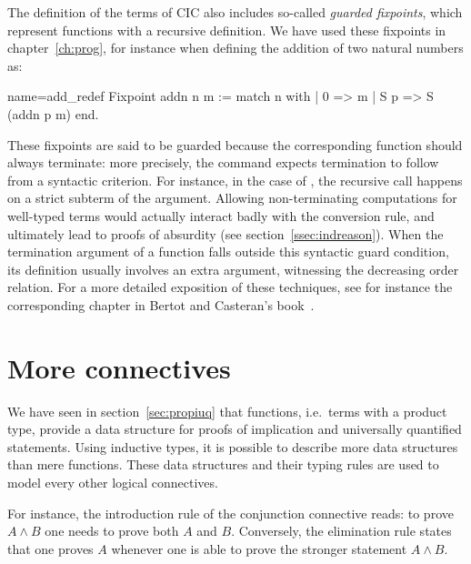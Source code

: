 The definition of the terms of CIC also includes so-called
\emph{guarded fixpoints}, which represent functions with a recursive
definition. We have used these fixpoints in chapter~\ref{ch:prog}, for
instance when defining the addition of two natural numbers as:

\begin{coq}{name=add_redef}{}
Fixpoint addn n m :=
  match n with
  | 0 => m
  | S p => S (addn p m)
  end.
\end{coq}
These fixpoints are said to be guarded because the corresponding
function should always terminate: more precisely, the 
command expects termination to follow from a syntactic
criterion. For instance, in the case of , the recursive call
happens on a strict subterm of the argument. Allowing
non-terminating computations for well-typed terms would actually
interact badly with the conversion rule, and ultimately lead to proofs
of absurdity (see section~\ref{ssec:indreason}). When the termination
argument of a function falls outside this syntactic guard condition,
its definition usually involves an extra argument, witnessing the
decreasing order relation. For a more detailed exposition of these
techniques, see for instance the corresponding chapter in Bertot and
Casteran's book~\cite[Chapter 14]{BC04}.




\section{More connectives}\label{sec:moreconns}
We have seen in section~\ref{sec:propiuq} that functions, i.e.~terms
with a product type, provide a data structure for proofs of implication
and universally quantified statements.
Using inductive types, it is possible to describe more data
structures than mere functions. %
These data structures and their
typing rules are used to model every other logical connectives.

For instance, the introduction rule of the conjunction
connective
reads: to prove $A \wedge B$ one needs to prove both
$A$ and $B$. Conversely, the elimination rule states that one proves 
$A$ whenever one is
able to prove the stronger statement $A \wedge B$.

